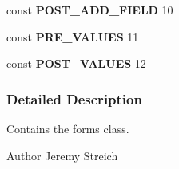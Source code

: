 \begin{DoxyCompactItemize}
\item 
\hypertarget{forms_8inc_8php_a75ad0e6abfbdbd730e4f61758672c049}{const {\bfseries P\-O\-S\-T\-\_\-\-A\-D\-D\-\_\-\-F\-I\-E\-L\-D} 10}\label{forms_8inc_8php_a75ad0e6abfbdbd730e4f61758672c049}

\item 
\hypertarget{forms_8inc_8php_aa01ebc82e7607bf3d5cef397523ac38a}{const {\bfseries P\-R\-E\-\_\-\-V\-A\-L\-U\-E\-S} 11}\label{forms_8inc_8php_aa01ebc82e7607bf3d5cef397523ac38a}

\item 
\hypertarget{forms_8inc_8php_ac66bb77a4d40924d49abe169c1e71ca8}{const {\bfseries P\-O\-S\-T\-\_\-\-V\-A\-L\-U\-E\-S} 12}\label{forms_8inc_8php_ac66bb77a4d40924d49abe169c1e71ca8}

\end{DoxyCompactItemize}


\subsubsection{Detailed Description}
Contains the forms class. \begin{DoxyAuthor}{Author}
Jeremy Streich 
\end{DoxyAuthor}
